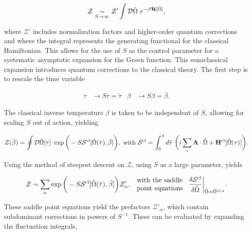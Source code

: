 \documentclass{homework}
\begin{document}
\begin{equation}
    \mathcal{Z} \underset{S \rightarrow \infty}{\sim} \mathcal{Z}' \int \mathcal{D}\hat{\Omega} \textnormal{ } e^{-\beta \bm{\mathcal{H}}[\hat{\Omega}]},
    \label{spin_wave_theoretic_wave_partition_func}
\end{equation}

where $\mathcal{Z}'$ includes normalization factors and higher-order quantum corrections and where the integral represents the generating functional for the classical Hamiltonian. This allows for the use of $S$ as the control parameter for a systematic asymptotic expansion for the Green function. This semiclassical expansion introduces quantum corrections to the classical theory. The first step is to rescale the time variable 

\begin{align}
    \tau &\rightarrow S\tau = \tilde{\tau} & \beta & \rightarrow S\beta = \bar{\beta}.
\end{align}

The classical inverse temperature $\beta$ is taken to be independent of $S$, allowing for scaling $S$ out of action, yielding 

\begin{equation}
    \mathcal{Z}(\bar{\beta}) = \oint \mathcal{D}\hat{\Omega}[\tau] \textnormal{ } \exp \bigg( - S \mathcal{S}^{\textnormal{cl}}[\hat{\Omega}(\bar{\tau}), \bar{\beta}]\bigg), \textnormal{ with } \mathcal{S}^{\textnormal{cl}} = \int_{0}^{\beta} d\bar{\tau} \textnormal{ } \bigg(i \sum_{i} {\bf A} \cdot \dot{\hat{\Omega}} + {\bf H}^{\textnormal{cl}}[\hat{\Omega}(\tau)]\bigg).
\end{equation}

Using the method of steepest descent on $\mathcal{Z}$, using $S$ as a large parameter, yields 

\begin{equation}
    \mathcal{Z} \sim \sum_{\alpha} \exp \bigg(-S \mathcal{S}^{\textnormal{cl}}[\hat{\Omega}(\bar{\tau}), \bar{\beta}]\bigg)\mathcal{Z}'_{\alpha}, \begin{array}{cc}
         \textnormal{ with the saddle } \\
         \textnormal{ point equations } 
    \end{array}\frac{\delta \mathcal{S}^{\textnormal{cl}}}{\delta \hat{\Omega}}\bigg|_{\hat{\Omega} = \hat{\Omega}^{\textnormal{cl}, \alpha}}. 
 \end{equation}

These saddle point equations yield the prefactors $\mathcal{Z}'_{\alpha}$, which contain subdominant corrections in powers of $S^{-1}$. These can be evaluated by expanding the fluctuation integrals, 
\end{document}
